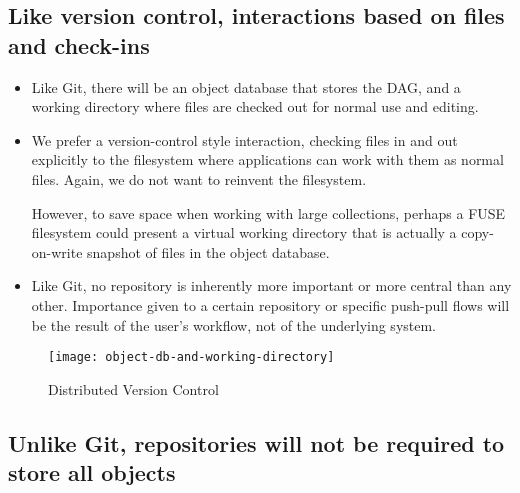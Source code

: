 \documentclass[a4paper]{article}
\begin{document}
\subsection{Like version control, interactions based on files and
check-ins}\label{like-version-control-interactions-based-on-files-and-check-ins}

\begin{itemize}
\item
  Like Git, there will be an object database that stores the DAG, and a
  working directory where files are checked out for normal use and
  editing.
\item
  We prefer a version-control style interaction, checking files in and
  out explicitly to the filesystem where applications can work with them
  as normal files. Again, we do not want to reinvent the filesystem.

  However, to save space when working with large collections, perhaps a FUSE
  filesystem could present a virtual working directory that is actually a
  copy-on-write snapshot of files in the object database.
\item
  Like Git, no repository is inherently more important or more central than any
  other. Importance given to a certain repository or specific push-pull flows
  will be the result of the user's workflow, not of the underlying system.
\end{itemize}


\begin{figure}[h!]
  \caption{Distributed Version Control}
  \label{fig:object-db-and-working-directory}
  \centering
    \texttt{[image: object-db-and-working-directory]}
\end{figure}



\subsection{Unlike Git, repositories will not be required to store
all
objects}\label{unlike-git-repositories-will-not-be-required-to-store-all-objects}
\end{document}
